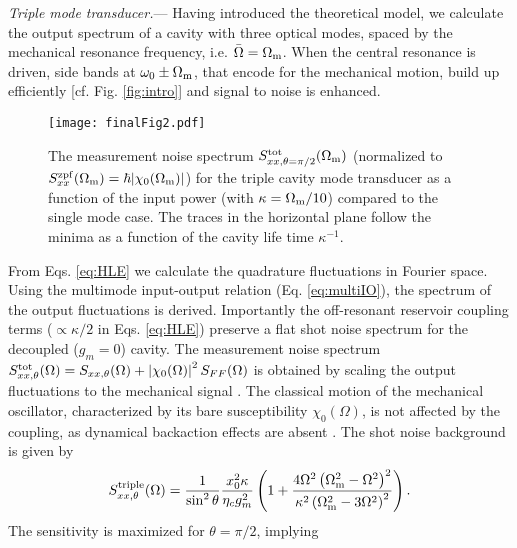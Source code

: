 \documentclass[twocolumn,english,aps,prl,superscriptaddress,showpacs,preprintnumbers]{revtex4}
\begin{document}
\textit{Triple mode transducer.}--- Having introduced the theoretical
model, we calculate the output spectrum of a cavity with three optical
modes, spaced by the mechanical resonance frequency, i.e. $\bar{\Omega}=\Omega_{\rm{m}}$.
When the central resonance is driven, side bands at $\omega_{0}\pm\Omega_{\rm{m}}$,
that encode for the mechanical motion, build up efficiently {[}cf.
Fig. \ref{fig:intro}{]} and signal to noise is enhanced. \\
\begin{figure}[ptb]
\begin{centering}
\texttt{[image: finalFig2.pdf]} 
\par\end{centering}

\caption{The measurement noise spectrum $S_{xx,\theta=\pi/2}^{\rm{tot}}(\Omega_{\rm{m}})$
(normalized to $S_{xx}^{\rm{zpf}}(\Omega_{\rm{m}})=\hbar |\chi_{0}(\Omega_{\rm{m}})|$) for the triple cavity mode transducer as a function of the input power 
(with $\kappa=\Omega_{\rm{m}}/10$) compared to the single mode case. The traces in the horizontal plane
follow the minima as a function of the cavity life time $\kappa^{-1}$.
\label{fig:1}}

\end{figure}
From Eqs. \ref{eq:HLE} we calculate the quadrature fluctuations in
Fourier space. Using the multimode input-output relation (Eq. \ref{eq:multiIO}),
the spectrum of the output fluctuations is derived. Importantly the
off-resonant reservoir coupling terms ($\propto\kappa/2$ in Eqs.
\ref{eq:HLE}) preserve a flat shot noise spectrum for the decoupled
($g_{m}=0$) cavity. The measurement noise spectrum $S_{xx,\theta}^{\rm{tot}}(\Omega)=S_{xx,\theta}(\Omega)+\left|\chi_{0}(\Omega)\right|^{2}S_{FF}(\Omega)$
is obtained by scaling the output fluctuations to the mechanical signal \cite{jaekel_quantum_1990}.
The classical motion of the mechanical oscillator, characterized by
its bare susceptibility $\chi_{0}(\Omega)$, is not affected by the
coupling, as dynamical backaction effects are absent \cite{kells_considerations_2002}.
The shot noise background is given by \begin{equation}
S_{xx,\theta}^{\rm{triple}}(\Omega)=\frac{1}{\sin^{2}\theta}\frac{x_{0}^{2}\kappa}{\eta_{c}g_{m}^{2}}\left(1+\frac{4\Omega^{2}\left(\Omega_{\rm{m}}^{2}-\Omega^{2}\right)^{2}}{\kappa^{2}\left(\Omega_{\rm{m}}^{2}-3\Omega^{2}\right)^{2}}\right).\label{eq:lambda3RT}\end{equation}
The sensitivity is maximized for $\theta =\pi/2$, implying
\end{document}
